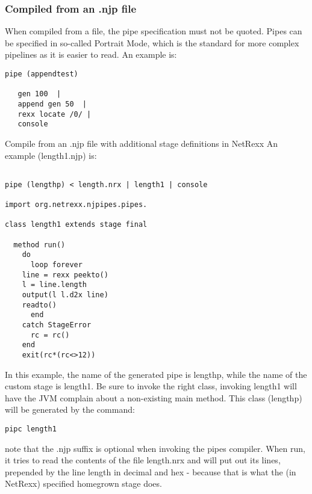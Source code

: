 \subsubsection{Compiled from an .njp file}
When compiled from a file, the pipe specification must not be quoted. Pipes can be specified in so-called Portrait Mode, which is the standard for more complex pipelines as it is easier to read.
An example is:
\begin{lstlisting}
pipe (appendtest)
 
   gen 100  |
   append gen 50  |
   rexx locate /0/ |
   console
\end{lstlisting}
Compile from an .njp file with additional stage definitions in NetRexx
An example (length1.njp) is:
\begin{lstlisting}

pipe (lengthp) < length.nrx | length1 | console
 
import org.netrexx.njpipes.pipes.
 
class length1 extends stage final
 
  method run()
    do
      loop forever
    line = rexx peekto()
    l = line.length
    output(l l.d2x line)
    readto()
      end
    catch StageError
      rc = rc()
    end
    exit(rc*(rc<>12))
\end{lstlisting}
In this example, the name of the generated pipe is lengthp, while the name of the custom stage is length1. Be sure to invoke the right class, invoking length1 will have the JVM complain about a non-existing main method.
This class (lengthp) will be generated by the command:
\begin{verbatim}
pipc length1
\end{verbatim}
note that the .njp suffix is optional when invoking the pipes
compiler. When run, it tries to read the contents of the file
length.nrx and will put out its lines, prepended by the line length in
decimal and hex - because that is what the (in NetRexx) specified
homegrown stage does.





%  

